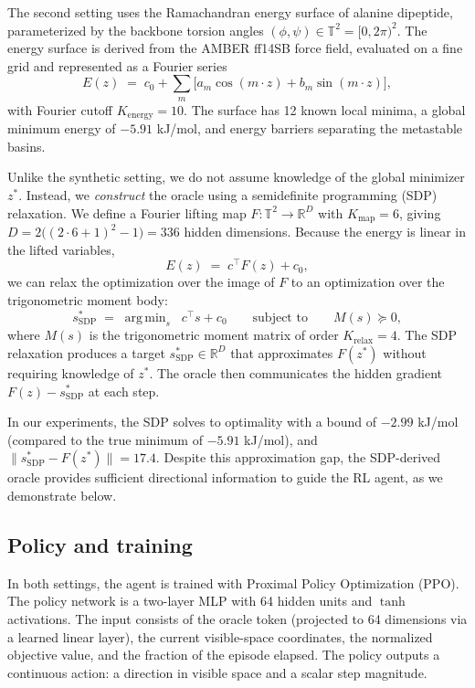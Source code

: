 \documentclass[10pt]{article}
\theoremstyle{definition}
\newcommand{\R}{\mathbb{R}}
\newcommand{\T}{\mathbb{T}}
\newcommand{\argmin}{\mathop{\mathrm{arg\,min}}}
\newcommand{\sdp}{\mathrm{SDP}}
\begin{document}
The second setting uses the Ramachandran energy surface of alanine dipeptide, parameterized by the backbone torsion angles $(\phi, \psi) \in \T^2 = [0, 2\pi)^2$. The energy surface is derived from the AMBER ff14SB force field, evaluated on a fine grid and represented as a Fourier series
\[
    E(z) \;=\; c_0 + \sum_{m} \bigl[ a_m \cos(m \cdot z) + b_m \sin(m \cdot z) \bigr],
\]
with Fourier cutoff $K_{\mathrm{energy}} = 10$. The surface has 12 known local minima, a global minimum energy of $-5.91$ kJ/mol, and energy barriers separating the metastable basins.

Unlike the synthetic setting, we do not assume knowledge of the global minimizer $z^*$. Instead, we \emph{construct} the oracle using a semidefinite programming (SDP) relaxation. We define a Fourier lifting map $F: \T^2 \to \R^D$ with $K_{\mathrm{map}} = 6$, giving $D = 2 \bigl((2 \cdot 6 + 1)^2 - 1\bigr) = 336$ hidden dimensions. Because the energy is linear in the lifted variables,
\[
    E(z) \;=\; c^{\!\top} F(z) + c_0,
\]
we can relax the optimization over the image of $F$ to an optimization over the trigonometric moment body:
\[
    s^*_{\sdp} \;=\; \argmin_{s} \;\; c^{\!\top} s + c_0 \qquad \text{subject to} \qquad M(s) \succeq 0,
\]
where $M(s)$ is the trigonometric moment matrix of order $K_{\mathrm{relax}} = 4$. The SDP relaxation produces a target $s^*_{\sdp} \in \R^D$ that approximates $F(z^*)$ without requiring knowledge of $z^*$. The oracle then communicates the hidden gradient $F(z) - s^*_{\sdp}$ at each step.

In our experiments, the SDP solves to optimality with a bound of $-2.99$ kJ/mol (compared to the true minimum of $-5.91$ kJ/mol), and $\|s^*_{\sdp} - F(z^*)\| = 17.4$. Despite this approximation gap, the SDP-derived oracle provides sufficient directional information to guide the RL agent, as we demonstrate below.

\subsection{Policy and training}

In both settings, the agent is trained with Proximal Policy Optimization (PPO). The policy network is a two-layer MLP with 64 hidden units and $\tanh$ activations. The input consists of the oracle token (projected to 64 dimensions via a learned linear layer), the current visible-space coordinates, the normalized objective value, and the fraction of the episode elapsed. The policy outputs a continuous action: a direction in visible space and a scalar step magnitude.
\end{document}

